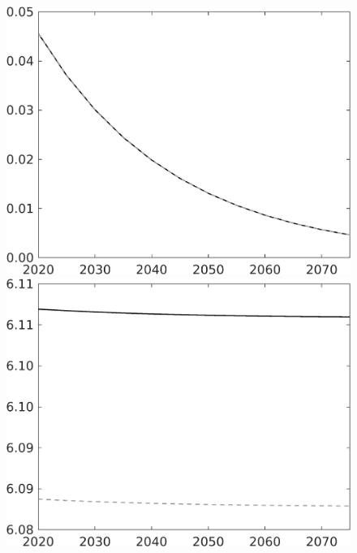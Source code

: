 \documentclass[12pt]{article}
\begin{document}
\begin{figure}[h!!]
\begin{minipage}[]{0.32\textwidth}
	\end{minipage}		
	\begin{minipage}[]{0.32\textwidth}
		\includegraphics[width=1\textwidth]{../../codding_model/own_basedOnFried/optimalPol_010922_revision/figures/all_13Sept22/CompTaul_Equlab_LFBAU_Reg0_pepn_spillover0_nsk0_xgr1_knspil1_sep1_countec0_GovRev0_etaa0.79_lgd0.png}
	\end{minipage}	
	\begin{minipage}[]{0.32\textwidth}
		\includegraphics[width=1\textwidth]{../../codding_model/own_basedOnFried/optimalPol_010922_revision/figures/all_13Sept22/CompTaul_Equlab_LFBAU_Reg0_pgpftf_spillover0_nsk0_xgr1_knspil1_sep1_countec0_GovRev0_etaa0.79_lgd0.png}

\end{minipage}
\end{figure}
\end{document}
